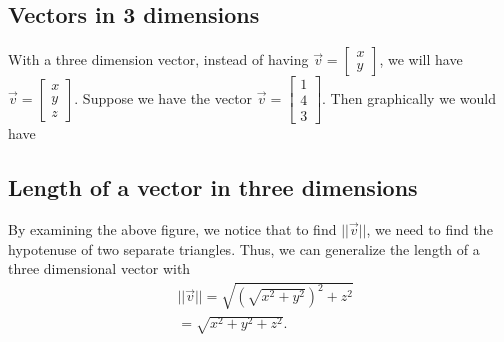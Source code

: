 \documentclass{report}
\begin{document}
    \bigbreak \noindent 
    \subsection{Vectors in 3 dimensions}
    \bigbreak \noindent 
    With a three dimension vector, instead of having $\vec{v} = \begin{bmatrix} x \\ y \end{bmatrix} $, we will have $ \vec{v} = \begin{bmatrix} x \\ y  \\ z\end{bmatrix}$. Suppose we have the vector $ \vec{v} = \begin{bmatrix} 1 \\ 4 \\ 3 \end{bmatrix}$. Then graphically we would have
    \bigbreak \noindent 
    \begin{figure}[ht]
        \centering
        \label{fig:vectors6}
    \end{figure}

    \bigbreak \noindent 
    \subsection{Length of a vector in three dimensions}
    \bigbreak \noindent 
    By examining the above figure, we notice that to find $||\vec{v}||$, we need to find the hypotenuse of two separate triangles. Thus, we can generalize the length of a three dimensional vector with
    \begin{align*}
        &|| \vec{v} || = \sqrt{(\sqrt{x^{2} + y^{2}})^{2} + z^{2}} \\
        &=\sqrt{x^{2} + y^{2} + z^{2}}
    .\end{align*}

    \pagebreak \bigbreak \noindent 
\end{document}
